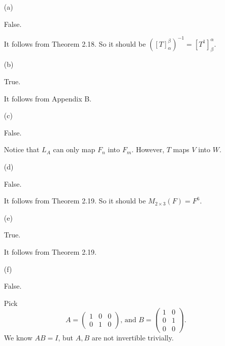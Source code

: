 \begin{Exercise}
	\begin{enumerate}[(a)]
		\item[(a)]
		\begin{answer}
			False.
		\end{answer}
		\begin{solution}
			It follows from Theorem 2.18. So it should be $([T]_{\alpha}^{\beta})^{-1} = [T^{1}]_{\beta}^{\alpha}$.
		\end{solution}
		
		\item[(b)]
		\begin{answer}
			True.
		\end{answer}
		\begin{solution}
			It follows from Appendix B.
		\end{solution}
		
		\item[(c)]
		\begin{answer}
			False.
		\end{answer}
		\begin{solution}
			Notice that $L_A$ can only map $F_n$ into $F_m$. However, $T$ maps $V$ into $W$.
		\end{solution}
		
		\item[(d)]
		\begin{answer}
			False.
		\end{answer}
		\begin{solution}
			It follows from Theorem 2.19. So it should be $M_{2\times 3}(F) = F^6$.
		\end{solution}
		
		\item[(e)]
		\begin{answer}
			True.
		\end{answer}
		\begin{solution}
			It follows from Theorem 2.19.
		\end{solution}
		
		\item[(f)]
		\begin{answer}
			False.
		\end{answer}
		\begin{solution}
			Pick
			$$
			A = \begin{pmatrix}
			1 & 0 & 0 \\
			0 & 1 & 0
			\end{pmatrix} \text{, and }
			B = \begin{pmatrix}
			1 & 0 \\
			0 & 1 \\
			0 & 0
			\end{pmatrix}.
			$$
			We know $AB = I$, but $A,B$ are not invertible trivially.
		\end{solution}
		

\end{enumerate}
\end{Exercise}
